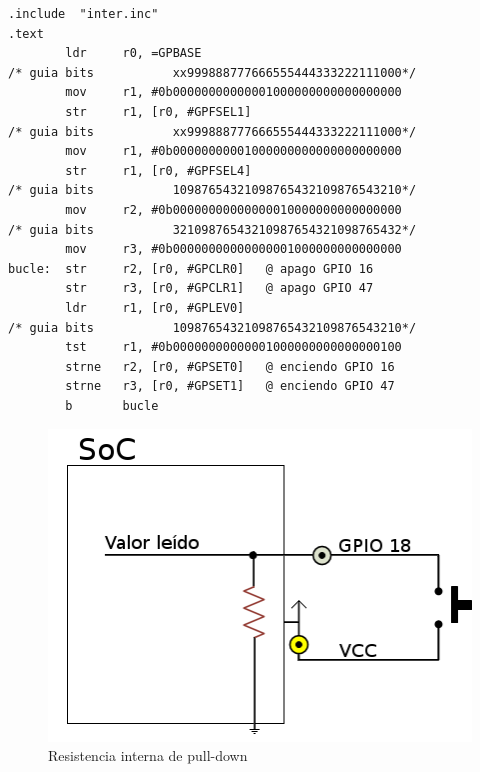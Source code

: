 \begin{lstlisting}[caption={apend3.s},label={lst:codigoApendice_3}]
        .include  "inter.inc"
.text
        ldr     r0, =GPBASE
/* guia bits           xx999888777666555444333222111000*/
        mov     r1, #0b00000000000001000000000000000000
        str     r1, [r0, #GPFSEL1]
/* guia bits           xx999888777666555444333222111000*/
        mov     r1, #0b00000000001000000000000000000000
        str     r1, [r0, #GPFSEL4]
/* guia bits           10987654321098765432109876543210*/
        mov     r2, #0b00000000000000010000000000000000
/* guia bits           32109876543210987654321098765432*/
        mov     r3, #0b00000000000000001000000000000000
bucle:  str     r2, [r0, #GPCLR0]   @ apago GPIO 16
        str     r3, [r0, #GPCLR1]   @ apago GPIO 47
        ldr     r1, [r0, #GPLEV0]
/* guia bits           10987654321098765432109876543210*/
        tst     r1, #0b00000000000001000000000000000100
        strne   r2, [r0, #GPSET0]   @ enciendo GPIO 16
        strne   r3, [r0, #GPSET1]   @ enciendo GPIO 47
        b       bucle
\end{lstlisting}

\begin{figure}[h]
  \centering
    \includegraphics[width=14cm]{graphs/pulldown.png}
  \caption{Resistencia interna de pull-down}
  \label{fig:pulldown}
\end{figure}

\chapterend
